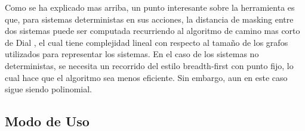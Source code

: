 Como se ha explicado mas arriba, un punto interesante sobre la herramienta es que, para sistemas deterministas en sus acciones, la distancia de masking entre dos sistemas puede ser computada recurriendo al algoritmo de camino mas corto de Dial \cite{Dial69}, el cual tiene complejidad lineal con respecto al tamaño de los grafos utilizados para representar los sistemas.
En el caso de los sistemas no deterministas, se necesita un recorrido del estilo 
breadth-first con punto fijo, lo cual hace que el algoritmo sea menos eficiente. Sin embargo, aun en este caso sigue siendo polinomial. 



\subsection{Modo de Uso}

